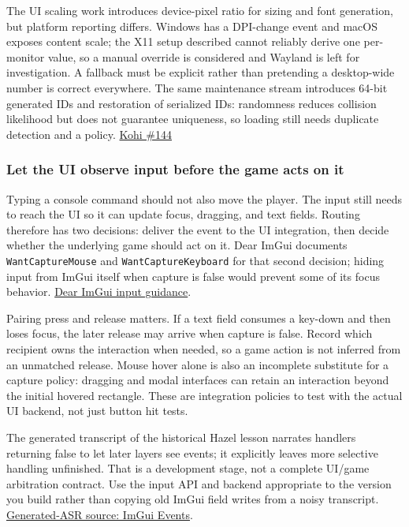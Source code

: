 The UI scaling work introduces device-pixel ratio for sizing and font generation, but platform reporting differs. Windows has a DPI-change event and macOS exposes content scale; the X11 setup described cannot reliably derive one per-monitor value, so a manual override is considered and Wayland is left for investigation. A fallback must be explicit rather than pretending a desktop-wide number is correct everywhere. The same maintenance stream introduces 64-bit generated IDs and restoration of serialized IDs: randomness reduces collision likelihood but does not guarantee uniqueness, so loading still needs duplicate detection and a policy. \href{https://www.youtube.com/watch?v=YCYZtc2PrtY}{Kohi \#144}

\subsubsection{Let the UI observe input before the game acts on it}\label{05-engine-i-ch013-let-the-ui-observe-input-before-the-game-acts-on-it}

Typing a console command should not also move the player. The input still needs to reach the UI so it can update focus, dragging, and text fields. Routing therefore has two decisions: deliver the event to the UI integration, then decide whether the underlying game should act on it. Dear ImGui documents \texttt{WantCaptureMouse} and \texttt{WantCaptureKeyboard} for that second decision; hiding input from ImGui itself when capture is false would prevent some of its focus behavior. \href{https://github.com/ocornut/imgui/blob/master/docs/FAQ.md\#q-how-can-i-tell-whether-to-dispatch-mousekeyboard-to-dear-imgui-or-my-application}{Dear ImGui input guidance}.

Pairing press and release matters. If a text field consumes a key-down and then loses focus, the later release may arrive when capture is false. Record which recipient owns the interaction when needed, so a game action is not inferred from an unmatched release. Mouse hover alone is also an incomplete substitute for a capture policy: dragging and modal interfaces can retain an interaction beyond the initial hovered rectangle. These are integration policies to test with the actual UI backend, not just button hit tests.

The generated transcript of the historical Hazel lesson narrates handlers returning false to let later layers see events; it explicitly leaves more selective handling unfinished. That is a development stage, not a complete UI/game arbitration contract. Use the input API and backend appropriate to the version you build rather than copying old ImGui field writes from a noisy transcript. \href{https://www.youtube.com/watch?v=yBP1gSbQPPM}{Generated-ASR source: ImGui Events}.

